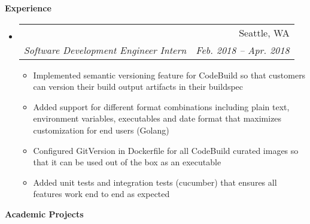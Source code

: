 \documentclass{article}
\makeatletter
\newcommand{\resitem}[1]{
    \item #1
    \vspace{-2pt}
}
\newcommand{\resheading}[1]{{\large \colorbox{mygrey}{\begin{minipage}{\textwidth}{\textbf{#1 \vphantom{p\^{E}}}}\end{minipage}}}}
\newcommand{\ressubheading}[4]{
\begin{tabular*}{6.80in}{l@{\extracolsep{\fill}}r}
    \textbf{#1} & #2 \\
    \textit{#3} & \textit{#4} \\
\end{tabular*}\vspace{-6pt}}
\makeatother
\begin{document}

    \resheading{Experience}

    \begin{itemize}
        \item
        \ressubheading
        {\href
            {https://aws.amazon.com/codebuild/}
            {Amazon Web Services - AWS CodeBuild}
        }
        {Seattle, WA}
        {Software Development Engineer Intern}
        {Feb. 2018 -- Apr. 2018}
        {\footnotesize
        \begin{itemize} %
            \resitem
            {Implemented semantic versioning feature for CodeBuild so that
             customers can version their build output artifacts in their buildspec}
            \resitem
            {Added support for different format combinations including plain text, environment variables,
            executables and date format that maximizes customization for end users (Golang)}
            \resitem
            {Configured GitVersion in Dockerfile for all CodeBuild curated images so that
            it can be used out of the box as an executable}
            \resitem
            {Added unit tests and integration tests (cucumber) that ensures all features work end to end as expected}
        \end{itemize}
        }

    \end{itemize}


    \resheading{Academic Projects}
\end{document}
